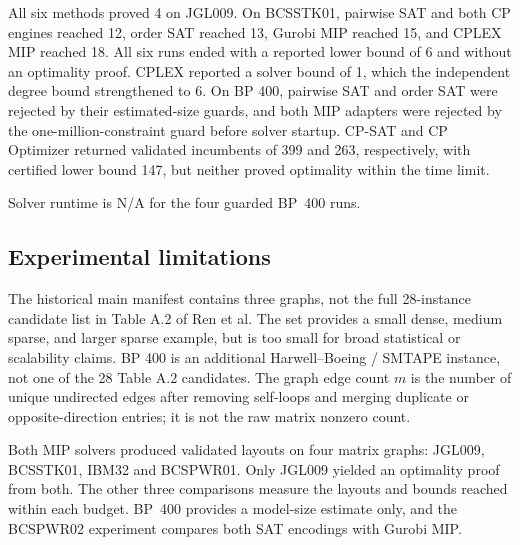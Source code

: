 All six methods proved 4 on JGL009. On BCSSTK01, pairwise SAT and both CP
engines reached 12, order SAT reached 13, Gurobi MIP reached 15, and CPLEX
MIP reached 18. All six runs ended with a reported lower bound of 6 and
without an optimality proof. CPLEX reported a solver bound of 1, which
the independent degree bound strengthened to 6. On BP 400, pairwise SAT and
order SAT were rejected by their estimated-size guards, and both MIP
adapters were rejected by the one-million-constraint guard before solver
startup. CP-SAT and CP Optimizer returned validated incumbents of 399 and
263, respectively, with certified lower bound 147, but neither proved
optimality within the time limit.

Solver runtime is N/A for the four guarded BP~400 runs.

\subsection{Experimental limitations}
The historical main manifest contains three graphs, not the full 28-instance
candidate list in Table A.2 of Ren et al. The set provides a small dense,
medium sparse, and larger sparse example, but is too small for broad
statistical or scalability claims. BP 400 is an additional Harwell--Boeing /
SMTAPE instance, not one of the 28 Table A.2 candidates. The graph edge count
$m$ is the number of unique undirected edges after removing self-loops and
merging duplicate or opposite-direction entries; it is not the raw matrix
nonzero count.

Both MIP solvers produced validated layouts on four matrix graphs:
JGL009, BCSSTK01, IBM32 and BCSPWR01. Only JGL009 yielded an optimality
proof from both. The other three comparisons measure the layouts and
bounds reached within each budget. BP~400 provides a model-size estimate
only, and the BCSPWR02 experiment compares both SAT encodings with Gurobi MIP.
